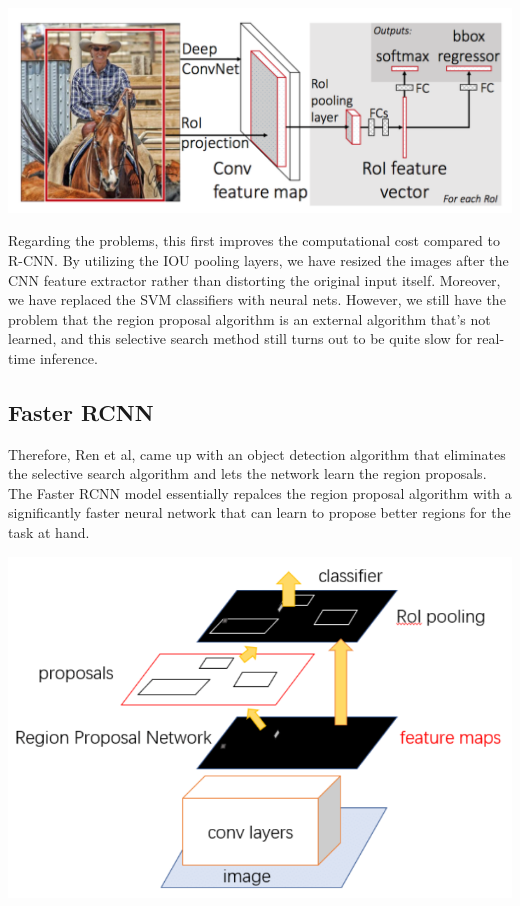 \documentclass{article}
\begin{document}
    \begin{center}
        \includegraphics[scale=0.3]{img/fast_rcnn.png}
    \end{center}

    Regarding the problems, this first improves the computational cost compared to R-CNN. By utilizing the IOU pooling layers, we have resized the images after the CNN feature extractor rather than distorting the original input itself. Moreover, we have replaced the SVM classifiers with neural nets. However, we still have the problem that the region proposal algorithm is an external algorithm that's not learned, and this selective search method still turns out to be quite slow for real-time inference.  

  \subsection{Faster RCNN}

    Therefore, Ren et al, came up with an object detection algorithm that eliminates the selective search algorithm and lets the network learn the region proposals. The Faster RCNN model essentially repalces the region proposal algorithm with a significantly faster neural network that can learn to propose better regions for the task at hand. 
    \begin{center}
        \includegraphics[scale=0.4]{img/faster_rcnn_diagram.png}
    \end{center}
\end{document}
